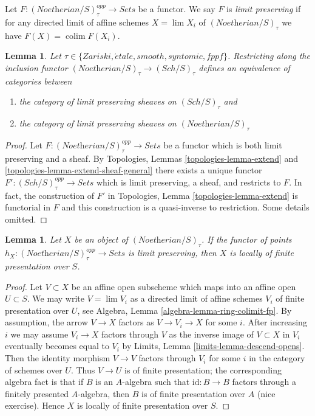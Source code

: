 \documentclass{stacks-project}
\theoremstyle{plain}
\newtheorem{lemma}[subsection]{Lemma}
\theoremstyle{definition}
\theoremstyle{remark}
\numberwithin{equation}{subsection}
\def\lim{\mathop{\mathrm{lim}}\nolimits}
\def\colim{\mathop{\mathrm{colim}}\nolimits}
\def\Sch{\mathit{Sch}}
\def\etale{{\acute{e}tale}}
\begin{document}
\noindent
Let $F : (\textit{Noetherian}/S)_\tau^{opp} \to \textit{Sets}$
be a functor. We say $F$ is {\it limit preserving} if for any
directed limit of affine schemes $X = \lim X_i$ of
$(\textit{Noetherian}/S)_\tau$ we have $F(X) = \colim F(X_i)$.

\begin{lemma}
\label{lemma-canonical-extension}
Let $\tau \in \{Zariski, \etale, smooth, syntomic, fppf\}$.
Restricting along the inclusion functor
$(\textit{Noetherian}/S)_\tau \to (\Sch/S)_\tau$
defines an equivalence of categories between
\begin{enumerate}
\item the category of limit preserving sheaves on
$(\Sch/S)_\tau$ and
\item the category of limit preserving sheaves on
$(\textit{Noetherian}/S)_\tau$
\end{enumerate}
\end{lemma}

\begin{proof}
Let $F : (\textit{Noetherian}/S)_\tau^{opp} \to \textit{Sets}$
be a functor which is both limit preserving and a sheaf.
By Topologies, Lemmas
\ref{topologies-lemma-extend} and \ref{topologies-lemma-extend-sheaf-general}
there exists a unique functor
$F' : (\Sch/S)_\tau^{opp} \to \textit{Sets}$
which is limit preserving, a sheaf, and restricts to $F$.
In fact, the construction of $F'$ in
Topologies, Lemma \ref{topologies-lemma-extend}
is functorial in $F$ and this construction is a quasi-inverse
to restriction. Some details omitted.
\end{proof}

\begin{lemma}
\label{lemma-representable-limit-preserving}
Let $X$ be an object of $(\textit{Noetherian}/S)_\tau$. If the functor
of points $h_X : (\textit{Noetherian}/S)_\tau^{opp} \to \textit{Sets}$
is limit preserving, then $X$ is locally of finite presentation over $S$.
\end{lemma}

\begin{proof}
Let $V \subset X$ be an affine open subscheme which maps into an affine
open $U \subset S$. We may write $V = \lim V_i$ as a directed limit of affine
schemes $V_i$ of finite presentation over $U$, see
Algebra, Lemma \ref{algebra-lemma-ring-colimit-fp}.
By assumption, the arrow $V \to X$ factors as $V \to V_i \to X$
for some $i$. After increasing $i$ we may assume $V_i \to X$
factors through $V$ as the inverse image of $V \subset X$ in $V_i$
eventually becomes equal to $V_i$ by
Limits, Lemma \ref{limits-lemma-descend-opens}.
Then the identity morphism $V \to V$ factors through $V_i$ for some $i$
in the category of schemes over $U$. Thus $V \to U$ is of finite presentation;
the corresponding algebra fact is that if $B$ is an $A$-algebra
such that $\text{id} : B \to B$ factors through a finitely presented
$A$-algebra, then $B$ is of finite presentation over $A$ (nice exercise).
Hence $X$ is locally of finite presentation over $S$.
\end{proof}
\end{document}
